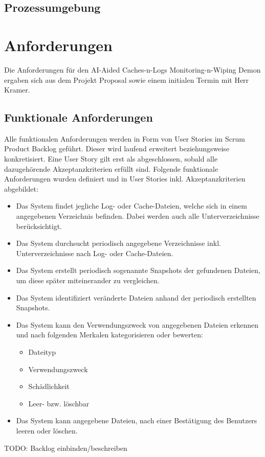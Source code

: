 \documentclass[a4paper,12pt]{report}
\begin{document}
    \clearpage
    \subsection{Prozessumgebung}

    \clearpage
    \section{Anforderungen}
    Die Anforderungen für den AI-Aided Caches-n-Logs Monitoring-n-Wiping Demon ergaben sich aus dem Projekt Proposal sowie einem initialen Termin mit Herr Kramer.

    \subsection{Funktionale Anforderungen}

    Alle funktionalen Anforderungen werden in Form von User Stories im Scrum Product Backlog geführt. Dieser wird laufend erweitert beziehungsweise konkretisiert. Eine User Story gilt erst als abgeschlossen, sobald alle dazugehörende Akzeptanzkriterien erfüllt sind. Folgende funktionale Anforderungen wurden definiert und in User Stories inkl. Akzeptanzkriterien abgebildet:
    \begin{itemize}
        \item Das System findet jegliche Log- oder Cache-Dateien, welche sich in einem angegebenen Verzeichnis befinden. Dabei werden auch alle Unterverzeichnisse berücksichtigt.
        \item Das System durchsucht periodisch angegebene Verzeichnisse inkl. Unterverzeichnisse nach Log- oder Cache-Dateien.
        \item Das System erstellt periodisch sogenannte Snapshots der gefundenen Dateien, um diese später miteinerander zu vergleichen.
        \item Das System identifiziert veränderte Dateien anhand der periodisch erstellten Snapshots.
        \item Das System kann den Verwendungszweck von angegebenen Dateien erkennen und nach folgenden Merkalen kategorisieren oder bewerten:
        \begin{itemize}
            \item Dateityp
            \item Verwendungszweck
            \item Schädlichkeit
            \item Leer- bzw. löschbar
        \end{itemize}
        \item Das System kann angegebene Dateien, nach einer Bestätigung des Benutzers leeren oder löschen.
    \end{itemize}
    TODO: Backlog einbinden/beschreiben
\end{document}
